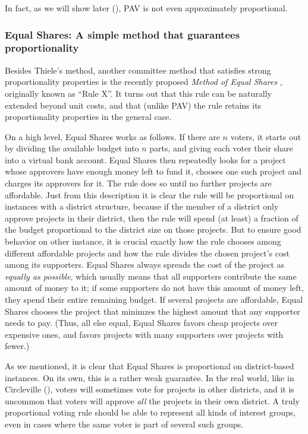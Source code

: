 \documentclass[10pt]{scrartcl}
\theoremstyle{definition}
\theoremstyle{plain}
\begin{document}
In fact, as we will show later (), PAV is not even approximately proportional.



\subsubsection*{Equal Shares: A simple method that guarantees proportionality}

Besides Thiele's method, another committee method that satisfies strong proportionality properties is the recently proposed \emph{Method of Equal Shares} \citep{pet-sko:laminar}, originally known as ``Rule X''.  It turns out that this rule can be naturally extended beyond unit costs, and that (unlike PAV) the rule retains its proportionality properties in the general case.

On a high level, Equal Shares works as follows. If there are $n$ voters, it starts out by dividing the available budget into $n$ parts, and giving each voter their share into a virtual bank account. Equal Shares then repeatedly looks for a project whose approvers have enough money left to fund it, chooses one such project and charges its approvers for it. The rule does so until no further projects are affordable. Just from this description it is clear the rule will be proportional on instances with a district structure, because if the member of a district only approve projects in their district, then the rule will spend (at least) a fraction of the budget proportional to the district size on those projects. But to ensure good behavior on other instance, it is crucial exactly how the rule chooses among different affordable projects and how the rule divides the chosen project's cost among its supporters. Equal Shares always spreads the cost of the project as \emph{equally as possible}, which usually means that all supporters contribute the same amount of money to it; if some supporters do not have this amount of money left, they spend their entire remaining budget. If several projects are affordable, Equal Shares chooses the project that minimzes the highest amount that any supporter needs to pay. (Thus, all else equal, Equal Shares favors cheap projects over expensive ones, and favors projects with many supporters over projects with fewer.)

As we mentioned, it is clear that Equal Shares is proportional on district-based instances. On its own, this is a rather weak guarantee. In the real world, like in Circleville (), voters will sometimes vote for projects in other districts, and it is uncommon that voters will approve \emph{all} the projects in their own district. A truly proportional voting rule should be able to represent all kinds of interest groups, even in cases where the same voter is part of several such groups.
\end{document}
